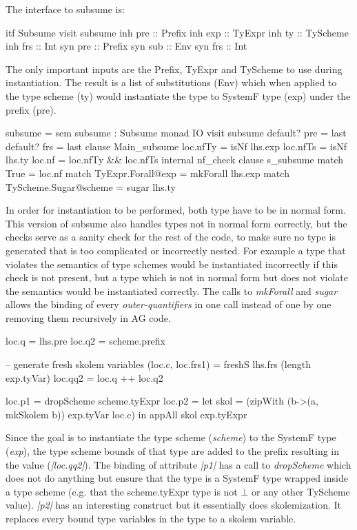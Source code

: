 The interface to subsume is:
\begin{code}
itf Subsume
  visit subsume
    inh pre  :: Prefix
    inh exp  :: TyExpr
    inh ty   :: TyScheme
    inh frs  :: Int
    syn pre  :: Prefix
    syn sub  :: Env
    syn frs  :: Int
\end{code}
The only important inputs are the Prefix, TyExpr and TyScheme to use during instantiation. The result is a list of substitutions (Env) which when applied to the type scheme (ty) would instantiate the type to SystemF type (exp) under the  prefix (pre).


\begin{code}
subsume = sem subsume : Subsume monad IO 
             visit subsume
               default? pre = last
               default? frs = last
               clause Main_subsume
                loc.nfTy  = isNf lhs.exp
                loc.nfTs  = isNf lhs.ty
                loc.nf    = loc.nfTy && loc.nfTs
                internal nf_check
                    clause s_subsume
                      match True                   = loc.nf
                      match TyExpr.Forall@exp      = mkForall lhs.exp
                      match TyScheme.Sugar@scheme  = sugar lhs.ty
\end{code}
In order for instantiation to be performed, both type have to be in normal form. This version of subsume also handles types not in normal form correctly, but the checks serve as a sanity check for the rest of the code, to make sure no type is  generated that is too complicated or incorrectly nested. For example a type that violates the semantics of type schemes would be instantiated incorrectly if this check is not present, but a type which is not in normal form but does not violate the semantics would be instantiated correctly.
The calls to \emph{mkForall} and \emph{sugar} allows the binding of every \emph{outer-quantifiers} in one call instead of one by one removing them recursively in AG code.

\begin{code}
loc.q   = lhs.pre
loc.q2  = scheme.prefix

-- generate fresh skolem variables
(loc.c, loc.frs1) = freshS lhs.frs (length exp.tyVar)
loc.qq2 = loc.q ++ loc.q2

loc.p1  = dropScheme scheme.tyExpr
loc.p2  =  let skol = (zipWith (\a b->(a, mkSkolem b)) exp.tyVar loc.c)
           in  appAll skol exp.tyExpr
\end{code}
Since the goal is to instantiate the type scheme (\emph{scheme}) to the SystemF type (\emph{exp}), the type scheme bounds of that type are added to the prefix resulting in the value (\emph{|loc.qq2|}). 
The binding of attribute \emph{|p1|} has a call to \emph{dropScheme} which does not do anything but ensure that the type is a SystemF type wrapped inside a type scheme (e.g. that the scheme.tyExpr type is not $\bot$ or any other TyScheme value). \emph{|p2|} has an interesting construct but it essentially does skolemization. It replaces every bound type variables in the type to a skolem variable.

